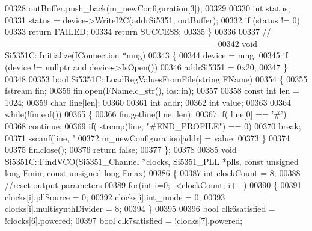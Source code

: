 \begin{DoxyCode}
00328     outBuffer.push\_back(m\_newConfiguration[3]);
00329 
00330     \textcolor{keywordtype}{int} status;
00331     status = device->WriteI2C(addrSi5351, outBuffer);
00332     \textcolor{keywordflow}{if} (status != 0)
00333         \textcolor{keywordflow}{return} FAILED;
00334     \textcolor{keywordflow}{return} SUCCESS;
00335 \}
00336 
00337 \textcolor{comment}{// ---------------------------------------------------------------------------}
00342 \textcolor{comment}{}\textcolor{keywordtype}{void} Si5351C::Initialize(IConnection *mng)
00343 \{
00344     device = mng;
00345     \textcolor{keywordflow}{if} (device != \textcolor{keyword}{nullptr} and device->IsOpen())
00346         addrSi5351 = 0x20;
00347 \}
00348 
00353 \textcolor{keywordtype}{bool} Si5351C::LoadRegValuesFromFile(\textcolor{keywordtype}{string} FName)
00354 \{
00355     fstream fin;
00356     fin.open(FName.c\_str(), ios::in);
00357 
00358     \textcolor{keyword}{const} \textcolor{keywordtype}{int} len = 1024;
00359     \textcolor{keywordtype}{char} line[len];
00360 
00361     \textcolor{keywordtype}{int} addr;
00362     \textcolor{keywordtype}{int} value;
00363 
00364     \textcolor{keywordflow}{while}(!fin.eof())
00365     \{
00366         fin.getline(line, len);
00367         \textcolor{keywordflow}{if}( line[0] == \textcolor{charliteral}{'#'})
00368             \textcolor{keywordflow}{continue};
00369         \textcolor{keywordflow}{if}( strcmp(line, \textcolor{stringliteral}{"#END\_PROFILE"}) == 0)
00370             \textcolor{keywordflow}{break};
00371         sscanf(line, \textcolor{stringliteral}{"%
00372         m\_newConfiguration[addr] = value;
00373     \}
00374 
00375     fin.close();
00376     \textcolor{keywordflow}{return} \textcolor{keyword}{false};
00377 \};
00378 
00385 \textcolor{keywordtype}{void} Si5351C::FindVCO(Si5351_Channel *clocks, Si5351_PLL *plls, \textcolor{keyword}{const} \textcolor{keywordtype}{unsigned} \textcolor{keywordtype}{long} Fmin, \textcolor{keyword}{const} \textcolor{keywordtype}{unsigned} \textcolor{keywordtype}{
      long} Fmax)
00386 \{
00387     \textcolor{keywordtype}{int} clockCount = 8;
00388     \textcolor{comment}{//reset output parameters}
00389     \textcolor{keywordflow}{for}(\textcolor{keywordtype}{int} i=0; i<clockCount; i++)
00390     \{
00391         clocks[i].pllSource = 0;
00392         clocks[i].int_mode = 0;
00393         clocks[i].multisynthDivider = 8;
00394     \}
00395 
00396     \textcolor{keywordtype}{bool} clk6satisfied = !clocks[6].powered;
00397     \textcolor{keywordtype}{bool} clk7satisfied = !clocks[7].powered;
}
\end{DoxyCode}
